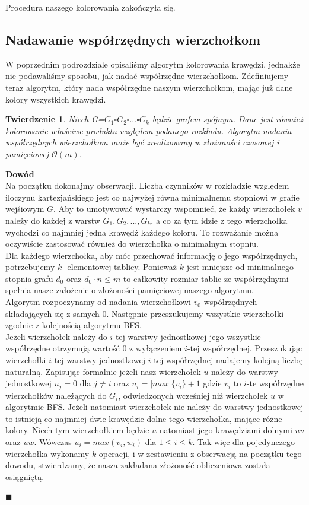 \documentclass[12pt,a4paper,titlepage]{article}
\newtheorem{twr}{Twierdzenie}
\newcommand\tab[1][1cm]{\hspace*{#1}}
\begin{document}
\tab[0.6cm]Procedura naszego kolorowania zakończyła się.
\subsection{Nadawanie współrzędnych wierzchołkom}
W poprzednim podrozdziale opisaliśmy algorytm kolorowania krawędzi, jednakże nie podawaliśmy sposobu, jak nadać współrzędne wierzchołkom. Zdefiniujemy teraz algorytm, który nada współrzędne naszym wierzchołkom, mając już dane kolory wszystkich krawędzi.\\

\begin{twr}Niech G=$G_1 \square G_2 \square ... \square G_k$ będzie grafem spójnym. Dane jest również kolorowanie właściwe produktu względem podanego rozkładu. Algorytm nadania współrzędnych wierzchołkom może być zrealizowany w złożoności czasowej i pamięciowej $\mathcal{O}(m)$.
\end{twr}
\tab[-0.6cm]\textbf{Dowód}\\
Na początku dokonajmy obserwacji. Liczba czynników w rozkładzie względem iloczynu kartezjańskiego jest co najwyżej równa minimalnemu stopniowi w grafie wejśiowym $G$. Aby to umotywować wystarczy wspomnieć, że każdy wierzchołek $v$ należy do każdej z warstw $G_1, G_2, ..., G_k$, a co za tym idzie z tego wierzchołka wychodzi co najmniej jedna krawędź każdego koloru. To rozważanie można oczywiście zastosować również do wierzchołka o minimalnym stopniu.\\
Dla każdego wierzchołka, aby móc przechować informację o jego współrzędnych, potrzebujemy $k$- elementowej tablicy. Ponieważ $k$ jest mniejsze od minimalnego stopnia grafu $d_0$ oraz $d_0 \cdot n \leqslant m$ to całkowity rozmiar tablic ze współrzędnymi spełnia nasze założenie o złożoności pamięciowej naszego algorytmu.\\
Algorytm rozpoczynamy od nadania wierzchołkowi $v_0$ współrzędnych składających się z samych 0. Następnie przeszukujemy wszystkie wierzchołki zgodnie z kolejnością algorytmu BFS. \\Jeżeli wierzchołek należy do $i$-tej warstwy jednostkowej jego wszystkie współrzędne otrzymują wartość 0 z wyłączeniem $i$-tej współrzędnej. Przeszukując wierzchołki $i$-tej warstwy jednostkowej $i$-tej współrzędnej nadajemy kolejną liczbę naturalną. Zapisując formalnie jeżeli nasz wierzchołek $u$ należy do warstwy jednostkowej $u_j =0$ dla $j \neq i$
oraz $u_i = |max|\{v_i\}+1$ gdzie $v_i $ to $i$-te współrzędne wierzchołków należących do $G_i$, odwiedzonych wcześniej niż wierzchołek $u$ w algorytmie BFS. 
Jeżeli natomiast wierzchołek nie należy do warstwy jednostkowej to istnieją co najmniej dwie krawędzie dolne tego wierzchołka, mające różne kolory. Niech tym wierzchołkiem będzie $u$ natomiast jego krawędziami dolnymi $uv$ oraz $uw$. Wówczas $u_i = max(v_i , w_i )$ dla $1 \leqslant i \leqslant k$. Tak więc dla pojedynczego wierzchołka wykonamy $k$ operacji, i w zestawieniu z obserwacją na początku tego dowodu, stwierdzamy, że nasza zakładana złożoność obliczeniowa została osiągniętą.
\begin{flushright}
$\blacksquare$
\end{flushright}
\end{document}
